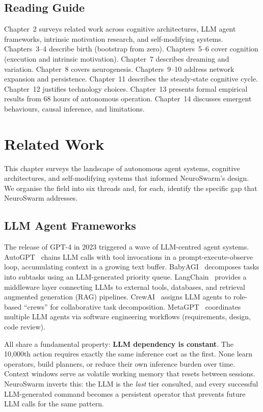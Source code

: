 \documentclass[12pt,a4paper]{report}
\begin{document}
\section{Reading Guide}
Chapter~2 surveys related work across cognitive architectures, LLM agent frameworks, intrinsic motivation research, and self-modifying systems. Chapters~3--4 describe birth (bootstrap from zero). Chapters~5--6 cover cognition (execution and intrinsic motivation). Chapter~7 describes dreaming and variation. Chapter~8 covers neurogenesis. Chapters~9--10 address network expansion and persistence. Chapter~11 describes the steady-state cognitive cycle. Chapter~12 justifies technology choices. Chapter~13 presents formal empirical results from 68 hours of autonomous operation. Chapter~14 discusses emergent behaviours, causal inference, and limitations.

\chapter{Related Work}

This chapter surveys the landscape of autonomous agent systems, cognitive architectures, and self-modifying systems that informed NeuroSwarm's design. We organise the field into six threads and, for each, identify the specific gap that NeuroSwarm addresses.

\section{LLM Agent Frameworks}

The release of GPT-4 in 2023 triggered a wave of LLM-centred agent systems. AutoGPT~\cite{autogpt2023} chains LLM calls with tool invocations in a prompt-execute-observe loop, accumulating context in a growing text buffer. BabyAGI~\cite{babyagi2023} decomposes tasks into subtasks using an LLM-generated priority queue. LangChain~\cite{langchain2023} provides a middleware layer connecting LLMs to external tools, databases, and retrieval augmented generation (RAG) pipelines. CrewAI~\cite{crewai2024} assigns LLM agents to role-based ``crews'' for collaborative task decomposition. MetaGPT~\cite{hong2023metagpt} coordinates multiple LLM agents via software engineering workflows (requirements, design, code review).

All share a fundamental property: \textbf{LLM dependency is constant}. The 10{,}000th action requires exactly the same inference cost as the first. None learn operators, build planners, or reduce their own inference burden over time. Context windows serve as volatile working memory that resets between sessions. NeuroSwarm inverts this: the LLM is the \emph{last} tier consulted, and every successful LLM-generated command becomes a persistent operator that prevents future LLM calls for the same pattern.
\end{document}
